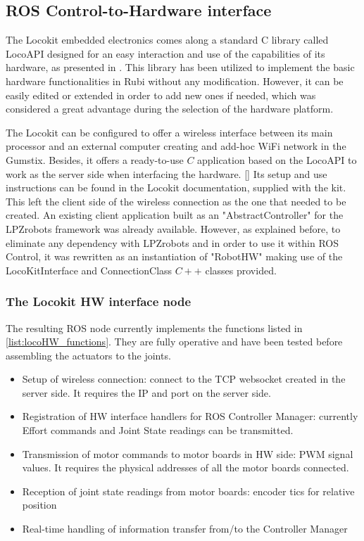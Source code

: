 \subsection{ROS Control-to-Hardware interface} %
\label{sub:ros_control_hardware_locokit_interface}
The Locokit embedded electronics comes along a standard C library called LocoAPI designed for an easy interaction and use of the capabilities of its hardware, as presented in \cite{locokit}.
This library has been utilized to implement the basic hardware functionalities in Rubi without any modification.
However, it can be easily edited or extended in order to add new ones if needed, which was considered a great advantage during the selection of the hardware platform.

The Locokit can be configured to offer a wireless interface between its main processor and an external computer creating and add-hoc WiFi network in the Gumstix.
Besides, it offers a ready-to-use $C$ application based on the LocoAPI to work as the server side when interfacing the hardware. \ref{} %
Its setup and use instructions can be found in the Locokit documentation, supplied with the kit.
This left the client side of the wireless connection as the one that needed to be created.
An existing client application built as an "AbstractController" for the LPZrobots framework was already available. 
However, as explained before, to eliminate any dependency with LPZrobots and in order to use it within ROS Control, it was rewritten as an instantiation of "RobotHW" making use of the LocoKitInterface and ConnectionClass $C++$ classes provided.

\subsubsection{The Locokit HW interface node} %
\label{ssub:the_locokit_hw_interface}
The resulting ROS node currently implements the functions listed in \ref{list:locoHW_functions}.
They are fully operative and have been tested before assembling the actuators to the joints.

\begin{itemize}
\label{list:locoHW_functions}
	\item Setup of wireless connection: connect to the TCP websocket created in the server side. It requires the IP and port on the server side.
	\item Registration of HW interface handlers for ROS Controller Manager: currently Effort commands and Joint State readings can be transmitted.
	\item Transmission of motor commands to motor boards in HW side: PWM signal values. It requires the physical addresses of all the motor boards connected.
	\item Reception of joint state readings from motor boards: encoder tics for relative position
	\item Real-time handling of information transfer from/to the Controller Manager
\end{itemize}

